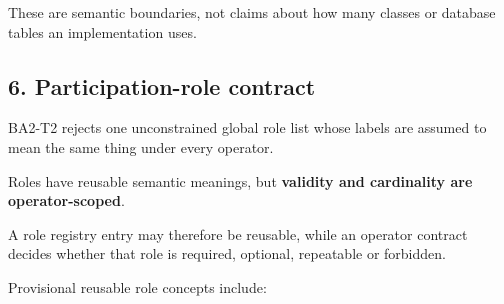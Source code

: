 \documentclass[
  10pt,
  letterpaper,
]{article}
\begin{document}
These are semantic boundaries, not claims about how many classes or
database tables an implementation uses.

\subsection{6. Participation-role
contract}\label{participation-role-contract}

BA2-T2 rejects one unconstrained global role list whose labels are
assumed to mean the same thing under every operator.

Roles have reusable semantic meanings, but \textbf{validity and
cardinality are operator-scoped}.

A role registry entry may therefore be reusable, while an operator
contract decides whether that role is required, optional, repeatable or
forbidden.

Provisional reusable role concepts include:
\end{document}
